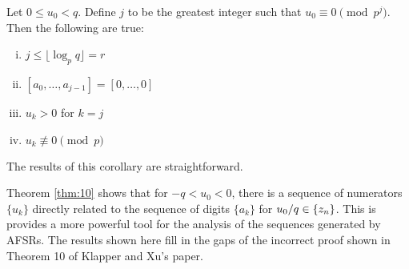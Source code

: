 \begin{corollary}\label{cor:aj}
  Let $0\leq u_0 < q$. Define $j$ to be the greatest integer such that
  $u_0 \equiv 0 \pmod p^j$. Then the following are true:
  \begin{enumerate}[i.]
    \item $j\leq\lfloor\log_p{q}\rfloor = r$
    \item $[a_0,\dots,a_{j-1}]=[0,\dots,0]$
    \item $u_k>0$ for $k=j$
    \item $u_k \not\equiv 0 \pmod p$
  \end{enumerate}
\end{corollary}
\par The results of this corollary are straightforward.

\par Theorem \ref{thm:10} shows that for $-q<u_0<0$, there is a sequence of
numerators $\{u_k\}$ directly related to the sequence of digits $\{a_k\}$
for $u_0/q\in\{z_n\}$. This is provides a more powerful tool for the analysis
of the sequences generated by AFSRs. The results shown here fill in the gaps of
the incorrect proof shown in Theorem 10 of Klapper and Xu's paper.


